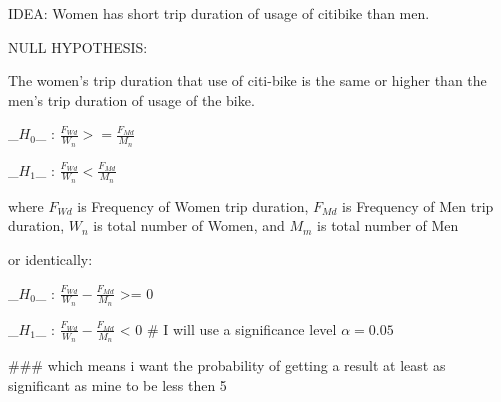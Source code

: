 IDEA:
Women has short trip duration of usage of citibike than men.

NULL HYPOTHESIS:

The women's trip duration that use of citi-bike is the same or higher than the men's trip duration of usage of the bike.

_$H_0$_ : $\frac{F_{Wd}}{W_{n}} >= \frac{F_{Md}}{M_{n}} $ 

_$H_1$_ : $\frac{F_{Wd}}{W_{n}} < \frac{F_{Md}}{M_{n}} $

where $F_{Wd}$ is Frequency of Women trip duration, $F_{Md}$ is Frequency of Men trip duration, ${W_{n}}$ is total number of Women, and ${M_{m}}$ is total number of Men

or identically:


_$H_0$_ : $\frac{F_{Wd}}{W_{n}} - \frac{F_{Md}}{M_{n}} $ >= 0

_$H_1$_ : $\frac{F_{Wd}}{W_{n}} - \frac{F_{Md}}{M_{n}} $ < 0
# I will use a significance level  $\alpha=0.05$

### which means i want the probability of getting a result at least as significant as mine to be less then 5%
